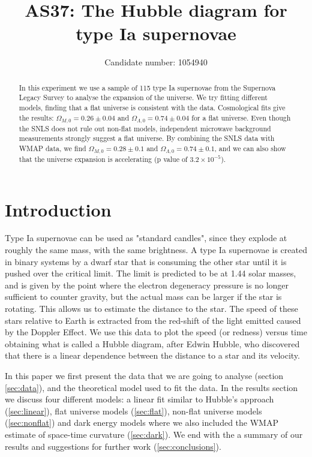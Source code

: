 \documentclass[11pt]{article}
\title{AS37: The Hubble diagram for type Ia supernovae}
\author{Candidate number: 1054940}
\begin{document}
\maketitle


\begin{abstract}
In this experiment we use a sample of 115 type Ia supernovae from the Supernova Legacy Survey to analyse the expansion of the universe. We try fitting different models, finding that a flat universe is consistent with the data. Cosmological fits give the results: $\Omega_{M,0} = 0.26 \pm 0.04$ and $\Omega_{\Lambda,0} = 0.74 \pm 0.04$ for a flat universe. Even though the SNLS does not rule out non-flat models, independent microwave background measurements strongly suggest a flat universe. By combining the SNLS data with WMAP data, we find $\Omega_{M,0} = 0.28 \pm 0.1$ and $\Omega_{\Lambda,0} = 0.74 \pm 0.1$, and we can also show that the universe expansion is accelerating (p value of $3.2 \times 10^{-5}$). 
\end{abstract}


\section{Introduction}
Type Ia supernovae can be used as "standard candles", since they explode at roughly the same mass, with the same brightness. A type Ia supernovae is created in binary systems by a dwarf star that is consuming the other star until it is pushed over the critical limit. The limit is predicted to be at 1.44 solar masses, and is given by the point where the electron degeneracy pressure is no longer sufficient to counter gravity, but the actual mass can be larger if the star is rotating. This allows us to estimate the distance to the star. The speed of these stars relative to Earth is extracted from the red-shift of the light emitted caused by the Doppler Effect. We use this data to plot the speed (or redness) versus time obtaining what is called a Hubble diagram, after Edwin Hubble, who discovered that there is a linear dependence between the distance to a star and its velocity. 

In this paper we first present the data that we are going to analyse (section \ref{sec:data}), and the theoretical model used to fit the data. In the results section we discuss four different models: a linear fit similar to Hubble's approach (\ref{sec:linear}), flat universe models (\ref{sec:flat}), non-flat universe models (\ref{sec:nonflat}) and dark energy models where we also included the WMAP estimate of space-time curvature (\ref{sec:dark}). We end with the a summary of our results and suggestions for further work (\ref{sec:conclusions}). 
\end{document}
